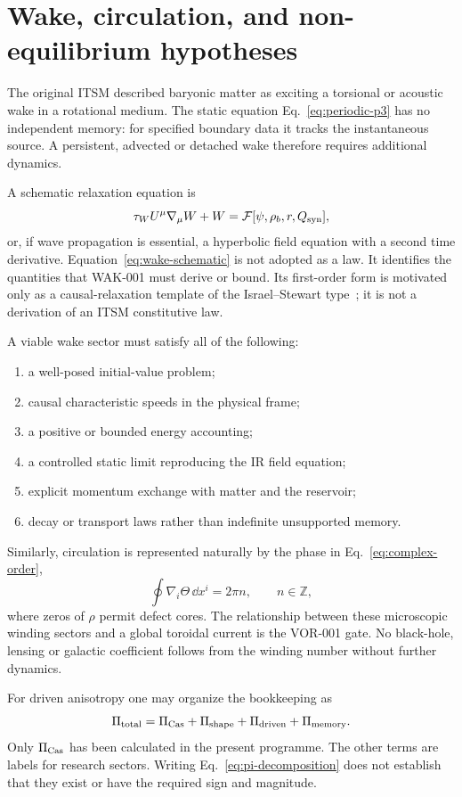 \section{Wake, circulation, and non-equilibrium hypotheses}

The original ITSM described baryonic matter as exciting a torsional or
acoustic wake in a rotational medium.  The static equation
Eq.~\eqref{eq:periodic-p3} has no independent memory: for specified boundary
data it tracks the instantaneous source.  A persistent, advected or detached
wake therefore requires additional dynamics.

A schematic relaxation equation is
\begin{equation}
 \tau_W U^\mu\nabla_\mu W+W
 =\mathcal F[\psi,\rho_b,r,Q_{\rm syn}],
 \label{eq:wake-schematic}
\end{equation}
or, if wave propagation is essential, a hyperbolic field equation with a
second time derivative.  Equation~\eqref{eq:wake-schematic} is not adopted as a
law.  It identifies the quantities that WAK-001 must derive or bound.
Its first-order form is motivated only as a causal-relaxation template of the
Israel--Stewart type~\cite{israelstewart1979}; it is not a derivation of an
ITSM constitutive law.

A viable wake sector must satisfy all of the following:
\begin{enumerate}
\item a well-posed initial-value problem;
\item causal characteristic speeds in the physical frame;
\item a positive or bounded energy accounting;
\item a controlled static limit reproducing the IR field equation;
\item explicit momentum exchange with matter and the reservoir;
\item decay or transport laws rather than indefinite unsupported memory.
\end{enumerate}

Similarly, circulation is represented naturally by the phase in
Eq.~\eqref{eq:complex-order},
\begin{equation}
 \oint \nabla_i\Theta\,\dd x^i=2\pi n,
 \qquad n\in\mathbb Z,
\end{equation}
where zeros of $\rho$ permit defect cores.  The relationship between these
microscopic winding sectors and a global toroidal current is the VOR-001 gate.
No black-hole, lensing or galactic coefficient follows from the winding number
without further dynamics.

For driven anisotropy one may organize the bookkeeping as
\begin{equation}
 \Pi_{\rm total}=\Pi_{\rm Cas}+\Pi_{\rm shape}
 +\Pi_{\rm driven}+\Pi_{\rm memory}.
 \label{eq:pi-decomposition}
\end{equation}
Only $\Pi_{\rm Cas}$ has been calculated in the present programme.  The other
terms are labels for research sectors.  Writing Eq.~\eqref{eq:pi-decomposition}
does not establish that they exist or have the required sign and magnitude.
